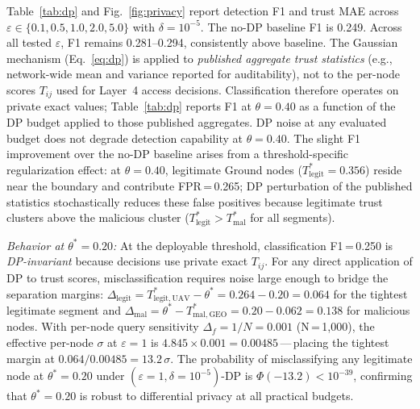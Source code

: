\documentclass[journal,twoside,10pt]{IEEEtran}
\begin{document}
Table~\ref{tab:dp} and Fig.~\ref{fig:privacy} report detection F1
and trust MAE across $\varepsilon\!\in\!\{0.1,0.5,1.0,2.0,5.0\}$
with $\delta\!=\!10^{-5}$.
The no-DP baseline F1 is 0.249.
Across all tested $\varepsilon$, F1 remains 0.281--0.294, consistently
above baseline.
The Gaussian mechanism (Eq.~\eqref{eq:dp}) is applied to \emph{published
aggregate trust statistics} (e.g., network-wide mean and variance reported
for auditability), not to the per-node scores $T_{ij}$ used for
Layer~4 access decisions.
Classification therefore operates on private exact values; Table~\ref{tab:dp}
reports F1 at $\theta\!=\!0.40$ as a function of the DP budget applied
to those published aggregates.
DP noise at any evaluated budget does not degrade detection capability
at $\theta\!=\!0.40$.
The slight F1 improvement over the no-DP baseline arises from a
threshold-specific regularization effect: at $\theta\!=\!0.40$,
legitimate Ground nodes ($T^*_{\mathrm{legit}}\!=\!0.356$) reside
near the boundary and contribute FPR\,=\,0.265; DP perturbation of
the published statistics stochastically reduces these false positives
because legitimate trust clusters above the malicious cluster
($T^*_{\mathrm{legit}}\!>\!T^*_{\mathrm{mal}}$ for all segments).

\textit{Behavior at $\theta^*\!=\!0.20$:}
At the deployable threshold, classification F1\,=\,0.250 is
\emph{DP-invariant} because decisions use private exact $T_{ij}$.
For any direct application of DP to trust scores, misclassification
requires noise large enough to bridge the separation margins:
$\Delta_{\mathrm{legit}}\!=\!T^*_{\mathrm{legit,UAV}}\!-\!\theta^*\!=\!0.264\!-\!0.20\!=\!0.064$
for the tightest legitimate segment and
$\Delta_{\mathrm{mal}}\!=\!\theta^*\!-\!T^*_{\mathrm{mal,GEO}}\!=\!0.20\!-\!0.062\!=\!0.138$
for malicious nodes.
With per-node query sensitivity $\Delta_f\!=\!1/N\!=\!0.001$
(N\,=\,1{,}000), the effective per-node $\sigma$ at $\varepsilon\!=\!1$
is $4.845\!\times\!0.001\!=\!0.00485$\,---\,placing the tightest
margin at $0.064/0.00485\!=\!13.2\,\sigma$.
The probability of misclassifying any legitimate node at
$\theta^*\!=\!0.20$ under $(\varepsilon\!=\!1,\delta\!=\!10^{-5})$-DP
is $\Phi(-13.2)\!<\!10^{-39}$, confirming that $\theta^*\!=\!0.20$ is
robust to differential privacy at all practical budgets.
\end{document}
